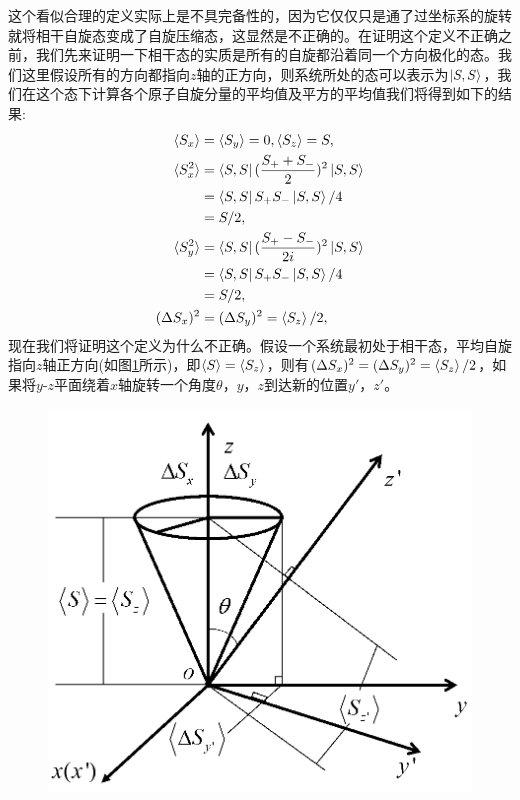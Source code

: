 这个看似合理的定义实际上是不具完备性的，因为它仅仅只是通了过坐标系的旋转就将相干自旋态变成了自旋压缩态，这显然是不正确的。在证明这个定义不正确之前，我们先来证明一下相干态的实质是所有的自旋都沿着同一个方向极化的态。我们这里假设所有的方向都指向$z$轴的正方向，则系统所处的态可以表示为$\ket{S,S}$，我们在这个态下计算各个原子自旋分量的平均值及平方的平均值我们将得到如下的结果:
\begin{align}\label{eq3310}
	\begin{split}
		\braket{S_x}    &= \braket{S_y}  = 0,	\braket{S_z}  = S,\\
		\braket{S_x^2}  &= \bra{S,S}(\frac{S_++S_-}2)^2\ket{S,S} \\
		            	&= \bra{S,S}S_+S_-\ket{S,S}/4\\
		            	&= S/2,\\
		\braket{S_y^2}  &= \bra{S,S}(\frac{S_+-S_-}{2i})^2\ket{S,S} \\
		            	&= \bra{S,S}S_+S_-\ket{S,S}/4\\
			            &= S/2,\\
		(\Delta S_x)^2  &= (\Delta S_y)^2 = \braket{S_z}/2,
	\end{split}
\end{align}
现在我们将证明这个定义为什么不正确。假设一个系统最初处于相干态，平均自旋指向$z$轴正方向(如图\ref{figure3}所示)，即$\braket{S}=\braket{S_z}$，则有$(\Delta S_x)^2  = (\Delta S_y)^2 = \braket{S_z}/2$，如果将$y$-$z$平面绕着$x$轴旋转一个角度$\theta$，$y$，$z$到达新的位置$y'$，$z'$。
\begin{figure}[h!]
	\centering
	\includegraphics[scale=0.45]{Img/Fig_3.png}\\
	\vspace{0.5cm}
		\label{figure3}
\end{figure}

